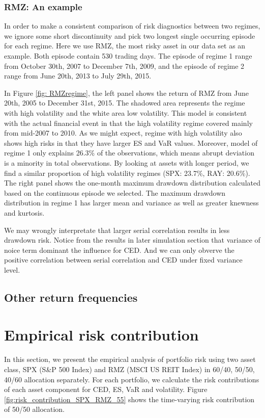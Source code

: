\documentclass[11pt]{article}
\begin{document}
\subsubsection{RMZ: An example}

In order to make a consistent comparison of risk diagnostics between two regimes, we ignore some short discontinuity and pick two longest single occurring episode for each regime. Here we use RMZ, the most risky asset in our data set as an example. Both episode contain 530 trading days. The episode of regime 1 range from October 30th, 2007 to December 7th, 2009, and the episode of regime 2 range from June 20th, 2013 to July 29th, 2015. 

In Figure \ref{fig: RMZregime}, the left panel shows the return of RMZ from June 20th, 2005 to December 31st, 2015. The shadowed area represents the regime with high volatility and the white area low volatility. This model is consistent with the actual financial event in that the high volatility regime covered mainly from mid-2007 to 2010. As we might expect, regime with high volatility also shows high risks in that they have larger ES and VaR values. Moreover, model of regime 1 only explains 26.3\% of the observations, which means abrupt deviation is a minority in total observations. By looking at assets with longer period, we find a similar proportion of high volatility regimes (SPX: 23.7\%, RAY: 20.6\%). The right panel shows the one-month maximum drawdown distribution calculated based on the continuous episode we selected. The maximum drawdown distribution in regime 1 has larger mean and variance as well as greater knewness and kurtosis. 

We may wrongly interpretate that larger serial correlation results in less drawdown risk. Notice from the results in later simulation section that variance of noice term dominant the influence for CED. And we can only obverve the positive correlation between serial correlation and CED under fixed variance level.


\subsection{Other return frequencies}

\section{Empirical risk contribution}

In this section, we present the empirical analysis of portfolio risk using two asset class, SPX (S\&P 500 Index) and RMZ (MSCI US REIT Index) in 60/40, 50/50, 40/60 allocation separately. For each portfolio, we calculate the risk contributions of each asset component for CED, ES, VaR and volatility. Figure \ref{fig:risk_contribution_SPX_RMZ_55} shows the time-varying risk contribution of 50/50 allocation. 
\end{document}

